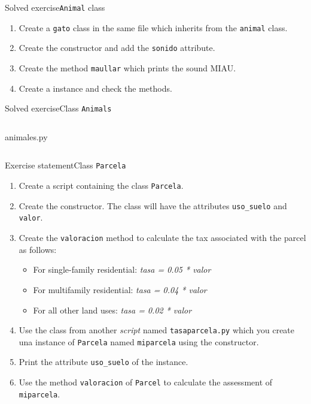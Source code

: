 \documentclass[10pt,compress]{beamer} %
\begin{document}
\begin{frame}{Solved exercise}{\texttt{Animal} class}
	\begin{enumerate}
		\item Create a \texttt{gato} class in the same file which inherits from the \texttt{animal} class. 
		\item Create the constructor and add the \texttt{sonido} attribute. 
		\item Create the method \texttt{maullar} which prints the sound MIAU. 
		\item Create a instance and check the methods.
	\end{enumerate}	
\end{frame}

\begin{frame}{Solved exercise}{Class \texttt{Animals}}
	\vspace{-0.4cm}
    \begin{columns}
			\begin{block}{animales.py}
			\vspace{-0.3cm} 
			\vspace{-0.3cm} 
			\end{block}
	\end{columns}
\end{frame}
\begin{frame}{Exercise statement}{Class \texttt{Parcela}}
	\begin{enumerate}
		\item Create a script containing the class \texttt{Parcela}. 
		\item Create the constructor. The class will have the attributes \texttt{uso\_suelo} and \texttt{valor}.
		\item Create the \texttt{valoracion} method to calculate the tax associated with the parcel as follows: 
		\begin{itemize}
		\item For single-family residential: \textit{tasa = 0.05 * valor}
		\item For multifamily residential: \textit{tasa = 0.04 * valor}
		\item For all other land uses: \textit{tasa = 0.02 * valor}
		\end{itemize}
		\item Use the class from another \textit{script} named \texttt{tasaparcela.py} which you create una instance of \texttt{Parcela} named \texttt{miparcela} using the constructor.
		\item Print the attribute  \texttt{uso\_suelo} of the instance.
		\item Use the method \texttt{valoracion} of \texttt{Parcel} to calculate the assessment of \texttt{miparcela}.
	\end{enumerate}	
\end{frame}
\end{document}
